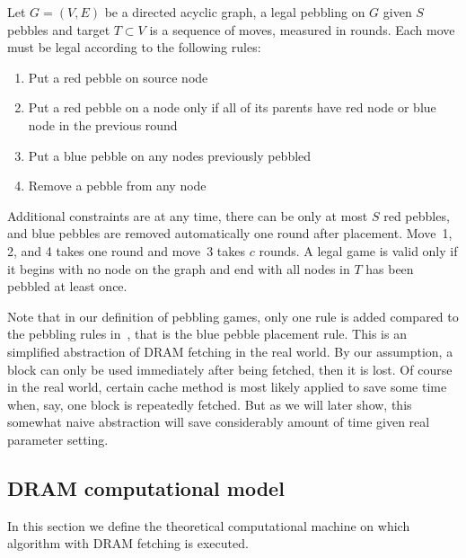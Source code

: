 \begin{definition}\label{def::dramPebblingRules}
  Let $G = (V, E)$ be a directed acyclic graph, a legal pebbling on $G$ given $S$ pebbles and target $T \subset V$
  is a sequence of moves, measured in rounds.
  Each move must be legal according to the following rules:

  \begin{enumerate}
    \item Put a red pebble on source node
    \item Put a red pebble on a node only if all of its parents have red node or blue node in the previous round
    \item Put a blue pebble on any nodes previously pebbled
    \item Remove a pebble from any node
  \end{enumerate}

  Additional constraints are at any time, there can be only at most $S$ red pebbles, and blue pebbles are removed automatically one round
  after placement. Move~1, 2, and 4 takes one round and move~3 takes $c$ rounds. A legal game is valid only if it begins with no node on the
  graph and end with all nodes in $T$ has been pebbled at least once.
\end{definition}

Note that in our definition of pebbling games, only one rule is added compared to the pebbling rules in~\cite{alwen2015high,corrigan2016balloon},
that is the blue pebble placement rule. This is an simplified abstraction of DRAM fetching in the real world. By our assumption, a block
can only be used immediately after being fetched, then it is lost. Of course in the real world, certain cache method is most likely applied
to save some time when, say, one block is repeatedly fetched. But as we will later show, this somewhat naive abstraction will save considerably
amount of time given real parameter setting.

\subsection{DRAM computational model}
In this section we define the theoretical computational machine on which algorithm with DRAM fetching is executed.

